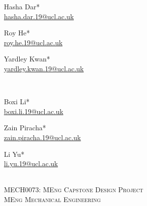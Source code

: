 \begin{titlepage}
\begin{minipage}{0.3\textwidth}
\centering
    {\Large Hasha Dar*}\\[0.2cm]
    \href{mailto:hasha.dar.19@ucl.ac.uk}{hasha.dar.19@ucl.ac.uk}
\end{minipage}
\begin{minipage}{0.3\textwidth}
\centering
    {\Large Roy He*}\\[0.2cm]
    \href{mailto:roy.he.19@ucl.ac.uk}{roy.he.19@ucl.ac.uk}
\end{minipage}
\begin{minipage}{0.3\textwidth}
\centering
    {\Large Yardley Kwan*}\\[0.2cm]
    \href{mailto:yardley.kwan.19@ucl.ac.uk}{yardley.kwan.19@ucl.ac.uk}
\end{minipage}\\[0.5cm]
\begin{minipage}{0.3\textwidth}
\centering
    {\LARGE Boxi Li*}\\[0.2cm]
    \href{mailto:boxi.li.19@ucl.ac.uk}{boxi.li.19@ucl.ac.uk}
\end{minipage}
\begin{minipage}{0.3\textwidth}
\centering
    {\Large Zain Piracha*}\\[0.2cm]
    \href{mailto:zain.piracha.19@ucl.ac.uk}{zain.piracha.19@ucl.ac.uk}
\end{minipage}
\begin{minipage}{0.3\textwidth}
\centering
    {\Large Li Yu*}\\[0.2cm]
    \href{mailto:li.yu.19@ucl.ac.uk}{li.yu.19@ucl.ac.uk}
\end{minipage}\\[3cm]



  \textsc{\LARGE MECH0073: MEng Capstone Design Project }\\ %
  \textsc{\LARGE MEng Mechanical Engineering  }\\[3cm] %


\end{titlepage}
